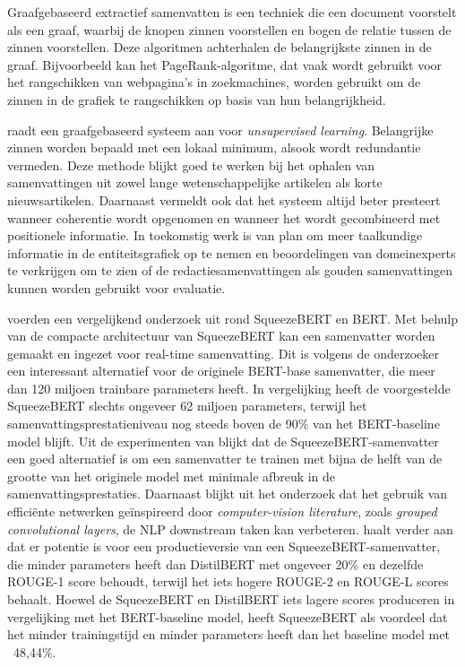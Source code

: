 Graafgebaseerd extractief samenvatten is een techniek die een document voorstelt als een graaf, waarbij de knopen zinnen voorstellen en bogen de relatie tussen de zinnen voorstellen. Deze algoritmen achterhalen de belangrijkste zinnen in de graaf. Bijvoorbeeld kan het PageRank-algoritme, dat vaak wordt gebruikt voor het rangschikken van webpagina's in zoekmachines, worden gebruikt om de zinnen in de grafiek te rangschikken op basis van hun belangrijkheid.

\textcite{Parveen2015} raadt een graafgebaseerd systeem aan voor \textit{unsupervised learning}. Belangrijke zinnen worden bepaald met een lokaal minimum, alsook wordt redundantie vermeden. Deze methode blijkt goed te werken bij het ophalen van samenvattingen uit zowel lange wetenschappelijke artikelen als korte nieuwsartikelen. Daarnaast vermeldt \textcite{Parveen2015} ook dat het systeem altijd beter presteert wanneer coherentie wordt opgenomen en wanneer het wordt gecombineerd met positionele informatie. In toekomstig werk is \textcite{Parveen2015} van plan om meer taalkundige informatie in de entiteitsgrafiek op te nemen en beoordelingen van domeinexperts te verkrijgen om te zien of de redactiesamenvattingen als gouden samenvattingen kunnen worden gebruikt voor evaluatie.

\textcite{AbdelSalam2022} voerden een vergelijkend onderzoek uit rond SqueezeBERT en BERT. Met behulp van de compacte architectuur van SqueezeBERT kan een samenvatter worden gemaakt en ingezet voor real-time samenvatting. Dit is volgens de onderzoeker een interessant alternatief voor de originele BERT-base samenvatter, die meer dan 120 miljoen trainbare parameters heeft. In vergelijking heeft de voorgestelde SqueezeBERT slechts ongeveer 62 miljoen parameters, terwijl het samenvattingsprestatieniveau nog steeds boven de 90\% van het BERT-baseline model blijft. Uit de experimenten van \textcite{AbdelSalam2022} blijkt dat de SqueezeBERT-samenvatter een goed alternatief is om een samenvatter te trainen met bijna de helft van de grootte van het originele model met minimale afbreuk in de samenvattingsprestaties. Daarnaast blijkt uit het onderzoek dat het gebruik van efficiënte netwerken geïnspireerd door \textit{computer-vision literature}, zoals \textit{grouped convolutional layers}, de NLP downstream taken kan verbeteren.  \textcite{AbdelSalam2022} haalt verder aan dat er potentie is voor een productieversie van een SqueezeBERT-samenvatter, die minder parameters heeft dan DistilBERT met ongeveer 20\% en dezelfde ROUGE-1 score behoudt, terwijl het iets hogere ROUGE-2 en ROUGE-L scores behaalt. Hoewel de SqueezeBERT en DistilBERT iets lagere scores produceren in vergelijking met het BERT-baseline model, heeft SqueezeBERT als voordeel dat het minder trainingstijd en minder parameters heeft dan het baseline model met ~48,44\%. 


